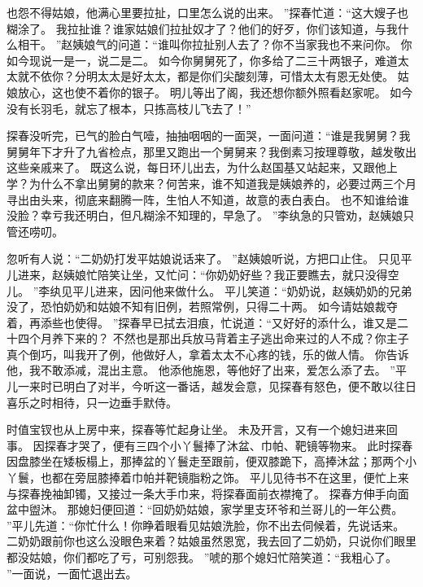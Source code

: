 也怨不得姑娘，他满心里要拉扯，口里怎么说的出来。
”探春忙道：“这大嫂子也糊涂了。
我拉扯谁？谁家姑娘们拉扯奴才了？他们的好歹，你们该知道，与我什么相干。
”赵姨娘气的问道：“谁叫你拉扯别人去了？你不当家我也不来问你。
你如今现说一是一，说二是二。
如今你舅舅死了，你多给了二三十两银子，难道太太就不依你？分明太太是好太太，都是你们尖酸刻薄，可惜太太有恩无处使。
姑娘放心，这也使不着你的银子。
明儿等出了阁，我还想你额外照看赵家呢。
如今没有长羽毛，就忘了根本，只拣高枝儿飞去了！”\par
探春没听完，已气的脸白气噎，抽抽咽咽的一面哭，一面问道：“谁是我舅舅？我舅舅年下才升了九省检点，那里又跑出一个舅舅来？我倒素习按理尊敬，越发敬出这些亲戚来了。
既这么说，每日环儿出去，为什么赵国基又站起来，又跟他上学？为什么不拿出舅舅的款来？何苦来，谁不知道我是姨娘养的，必要过两三个月寻出由头来，彻底来翻腾一阵，生怕人不知道，故意的表白表白。
也不知谁给谁没脸？幸亏我还明白，但凡糊涂不知理的，早急了。
”李纨急的只管劝，赵姨娘只管还唠叨。
\par
忽听有人说：“二奶奶打发平姑娘说话来了。
”赵姨娘听说，方把口止住。
只见平儿进来，赵姨娘忙陪笑让坐，又忙问：“你奶奶好些？我正要瞧去，就只没得空儿。
”李纨见平儿进来，因问他来做什么。
平儿笑道：“奶奶说，赵姨奶奶的兄弟没了，恐怕奶奶和姑娘不知有旧例，若照常例，只得二十两。
如今请姑娘裁夺着，再添些也使得。
”探春早已拭去泪痕，忙说道：“又好好的添什么，谁又是二十四个月养下来的？
不然也是那出兵放马背着主子逃出命来过的人不成？你主子真个倒巧，叫我开了例，他做好人，拿着太太不心疼的钱，乐的做人情。
你告诉他，我不敢添减，混出主意。
他添他施恩，等他好了出来，爱怎么添了去。
”平儿一来时已明白了对半，今听这一番话，越发会意，见探春有怒色，便不敢以往日喜乐之时相待，只一边垂手默侍。
\par
时值宝钗也从上房中来，探春等忙起身让坐。
未及开言，又有一个媳妇进来回事。
因探春才哭了，便有三四个小丫鬟捧了沐盆、巾帕、靶镜等物来。
此时探春因盘膝坐在矮板榻上，那捧盆的丫鬟走至跟前，便双膝跪下，高捧沐盆；那两个小丫鬟，也都在旁屈膝捧着巾帕并靶镜脂粉之饰。
平儿见待书不在这里，便忙上来与探春挽袖卸镯，又接过一条大手巾来，将探春面前衣襟掩了。
探春方伸手向面盆中盥沐。
那媳妇便回道：“回奶奶姑娘，家学里支环爷和兰哥儿的一年公费。
”平儿先道：“你忙什么！你睁着眼看见姑娘洗脸，你不出去伺候着，先说话来。
二奶奶跟前你也这么没眼色来着？姑娘虽然恩宽，我去回了二奶奶，只说你们眼里都没姑娘，你们都吃了亏，可别怨我。
”唬的那个媳妇忙陪笑道：“我粗心了。
”一面说，一面忙退出去。
\par
